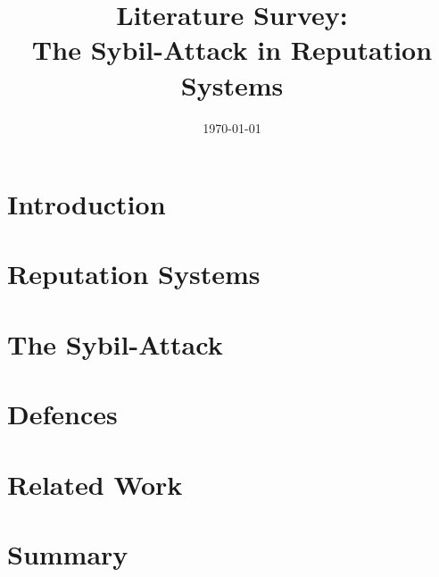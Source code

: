 \documentclass[12pt]{article}
\title{Literature Survey:\\The Sybil-Attack in Reputation Systems}
\date{\today}
\begin{document}
\maketitle
\begin{abstract}
\end{abstract}

\section{Introduction}


\section{Reputation Systems}\label{sec:reputation}


\section{The Sybil-Attack}\label{sec:sybil}


\section{Defences}\label{sec:defences}


\section{Related Work}\label{sec:related}


\section{Summary}

\printbibliography
\end{document}
